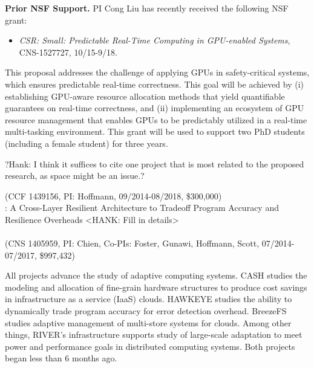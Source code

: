 \noindent \textbf{Prior NSF Support.} PI Cong Liu  has recently received the following NSF grant:

\begin{itemize}
\vspace{-2mm}
\item \textit{CSR: Small: Predictable Real-Time Computing in GPU-enabled Systems}, CNS-1527727, 10/15-9/18.
\vspace{-2mm}
\end{itemize}

This proposal addresses the challenge of applying GPUs in safety-critical systems, which ensures predictable real-time correctness. This goal will be achieved by (i) establishing GPU-aware resource allocation methods that yield quantifiable guarantees on real-time correctness, and (ii) implementing an ecosystem of GPU resource management that enables GPUs to be predictably utilized in a real-time multi-tasking environment. This grant will be used to support two PhD students (including a female student) for three years. 

?Hank: I think it suffices to cite one project that is most related to the proposed research, as space might be an issue.?

\vspace{0.05cm}

 (CCF 1439156, PI: Hoffmann, 09/2014-08/2018, \$300,000)\\
: A Cross-Layer Resilient Architecture to Tradeoff Program Accuracy and Resilience Overheads <HANK: Fill in details>\\
 \\
 (CNS 1405959, PI: Chien, Co-PIs: Foster, Gunawi, Hoffmann, Scott, 07/2014-07/2017, \$997,432) 

All projects advance the study of adaptive computing systems.  CASH
studies the modeling and allocation of fine-grain hardware structures
to produce cost savings in infrastructure as a service (IaaS) clouds.
HAWKEYE studies the ability to dynamically trade program accuracy for
error detection overhead.  BreezeFS studies adaptive management of
multi-store systems for clouds.  Among other things, RIVER's
infrastructure supports study of large-scale adaptation to meet power
and performance goals in distributed computing systems.  Both projects
began less than 6 months ago.

